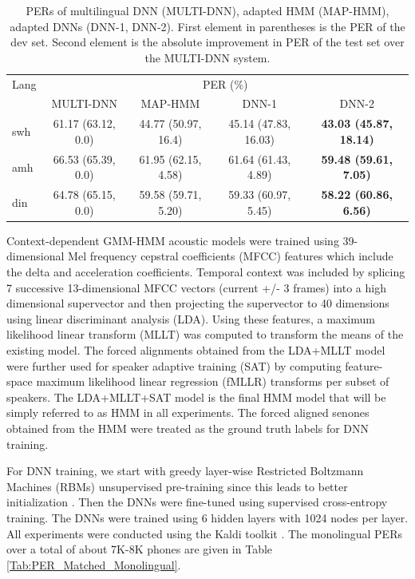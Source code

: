 \documentclass[a4paper]{article}
\begin{document}
\begin{table}[t]
\centering %
\caption{PERs of multilingual DNN (MULTI-DNN), adapted HMM (MAP-HMM), adapted DNNs (DNN-1, DNN-2). First element in parentheses is the PER of the dev set. Second element is the absolute improvement in PER of the test set over the MULTI-DNN system.}
\begin{tabular}{l|c c c c}
   \hline
Lang  & \multicolumn{4}{c}{PER (\%)} \\
        &MULTI-DNN        	   &MAP-HMM         		&DNN-1          &DNN-2          \\ \hline
swh      & 61.17 (63.12, 0.0) &44.77 (50.97, 16.4) &45.14 (47.83, 16.03) &\bf{43.03 (45.87, 18.14)}        \\
amh      & 66.53 (65.39, 0.0) &61.95 (62.15, 4.58)  &61.64  (61.43, 4.89)  &\bf{59.48 (59.61, 7.05)}     \\ 
din      &64.78 (65.15, 0.0) &59.58 (59.71, 5.20)  &59.33 (60.97, 5.45)  &\bf{58.22 (60.86, 6.56)}    \\ \hline
\end{tabular}
\vspace{-5mm}
\label{Tab:PER_PT}
\end{table}

Context-dependent GMM-HMM acoustic models were trained using 39-dimensional Mel frequency cepstral coefficients (MFCC) features which include the delta and acceleration coefficients. Temporal context was included by splicing 7 successive 13-dimensional MFCC vectors (current +/- 3 frames) into a high dimensional supervector and then projecting the supervector to 40 dimensions using linear discriminant analysis (LDA). Using these features, a maximum likelihood linear transform (MLLT) \cite{Gopinath-MLLT} was computed to transform the means of the existing model. The forced alignments obtained from the LDA+MLLT model were further used for speaker adaptive training (SAT) by computing feature-space maximum likelihood linear regression (fMLLR) transforms \cite{Gales-CMLLR} per subset of speakers. The LDA+MLLT+SAT model is the final HMM model that will be simply referred to as HMM in all experiments. The forced aligned senones obtained from the HMM were treated as the ground truth labels for DNN training. 

For DNN training, we start with greedy layer-wise Restricted Boltzmann Machines (RBMs) unsupervised pre-training since this leads to better initialization \cite{Bengio-Pretraining}. Then the DNNs were fine-tuned using supervised cross-entropy training. The DNNs were trained using 6 hidden layers with 1024 nodes per layer. All experiments were conducted using the Kaldi toolkit \cite{Povey-Kaldi}. The monolingual PERs over a total of about 7K-8K phones are given in Table \ref{Tab:PER_Matched_Monolingual}. 
\end{document}
